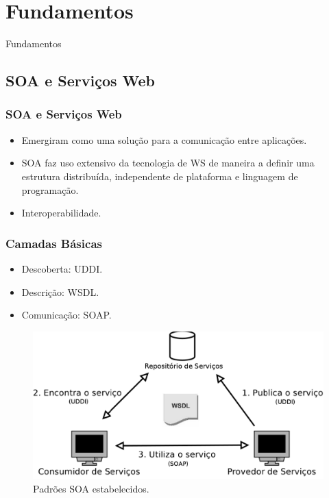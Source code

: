 \documentclass[red, cover=invisible, theme=Warsaw]{myslides}
\begin{document}
\section{Fundamentos}
    \begin{frame}
	\begin{center}
	{\Huge Fundamentos}
	\end{center}
    \end{frame}     

    \subsection{SOA e Serviços Web}
	\begin{frame}\frametitle{SOA e Serviços Web}
	    \begin{itemize}
	     \item Emergiram como uma solução para a comunicação entre aplicações.
	     \item SOA faz uso extensivo da tecnologia de WS de maneira a definir uma estrutura distribuída, independente de plataforma e linguagem de programação.
	     \item Interoperabilidade.
	    \end{itemize}
	\end{frame}
	
	\begin{frame}\frametitle{Camadas Básicas}
	    \begin{itemize}
	     \item Descoberta: UDDI.
	     \item Descrição: WSDL.
	     \item Comunicação: SOAP.
	    \end{itemize}
	    \begin{center}
		\begin{figure}
		\includegraphics[scale=0.35]{imagens/SOA.pdf}
		\caption{Padrões SOA estabelecidos.}
		\end{figure}					
	    \end{center}
	\end{frame}
    
\end{document}
